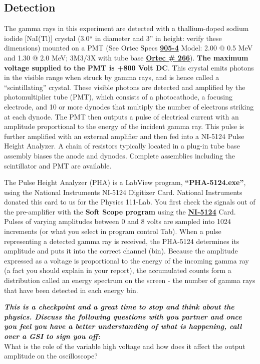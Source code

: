 \documentclass{../lab}
\begin{document}
\subsection{Detection}
The gamma rays in this experiment are detected with a thallium-doped sodium iodide [NaI(Tl)] crystal (3.0`` in diameter and 3'' in height: verify these dimensions) mounted on a PMT (See Ortec Specs \href{http://physics111.lib.berkeley.edu/Physics111/Reprints/GMA/905-series-nai-radiation-detectors.pdf}{\textbf{905-4}} Model: 2.00 @ 0.5 MeV and 1.30 @ 2.0 MeV; 3M3/3X with tube base \href{http://physics111.lib.berkeley.edu/Physics111/Reprints/GMA/266-Photomultiplier-Base.pdf}{\textbf{Ortec \# 266}}). \textbf{The maximum voltage supplied to the PMT is +800 Volt DC}. This crystal emits photons in the visible range when struck by gamma rays, and is hence called a ``scintillating'' crystal. These visible photons are detected and amplified by the photomultiplier tube (PMT), which consists of a photocathode, a focusing electrode, and 10 or more dynodes that multiply the number of electrons striking at each dynode. The PMT then outputs a pulse of electrical current with an amplitude proportional to the energy of the incident gamma ray. This pulse is further amplified with an external amplifier and then fed into a NI-5124 Pulse Height Analyzer. A chain of resistors typically located in a plug-in tube base assembly biases the anode and dynodes. Complete assemblies including the scintillator and PMT are available. 

The Pulse Height Analyzer (PHA) is a LabView program, \textbf{``PHA-5124.exe''}, using the National Instruments NI-5124 Digitizer Card. National Instruments donated this card to us for the Physics 111-Lab. You first check the signals out of the pre-amplifier with the \textbf{Soft Scope program} using the \href{http://physics111.lib.berkeley.edu/Physics111/Reprints/GMA/NI_PCI-5124.pdf}{\textbf{NI-5124}} Card. Pulses of varying amplitudes between 0 and 8 volts are sampled into 1024 increments (or what you select in program control Tab). When a pulse representing a detected gamma ray is received, the PHA-5124 determines its amplitude and puts it into the correct channel (bin). Because the amplitude expressed as a voltage is proportional to the energy of the incoming gamma ray (a fact you should explain in your report), the accumulated counts form a distribution called an energy spectrum on the screen - the number of gamma rays that have been detected in each energy bin.

\emph{\textbf{This is a checkpoint and a great time to stop and think about the physics. Discuss the following questions with you partner and once you feel you have a better understanding of what is happening, call over a GSI to sign you off:}}\\
What is the role of the variable high voltage and how does it affect the output amplitude on the oscilloscope?
\end{document}
